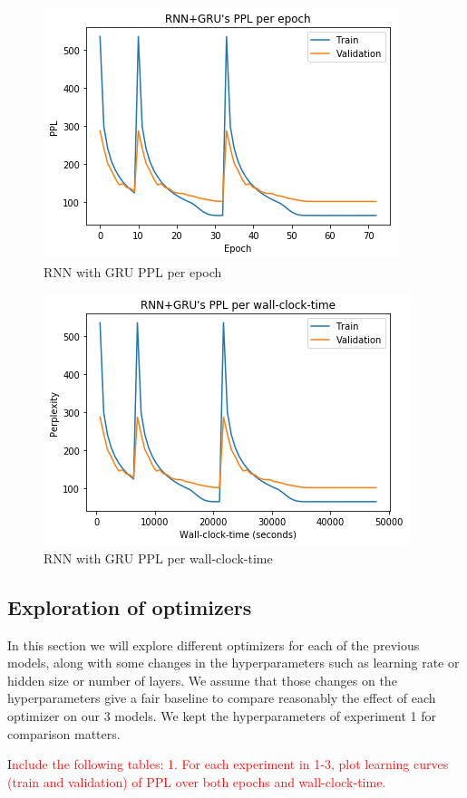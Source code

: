 \begin{figure}[H]
	\centering
	\includegraphics[scale=0.8]{GRU_LC_EPOCH.png}
	\caption{RNN with GRU PPL per epoch}
	\label{fig:fig3}
\end{figure}

\begin{figure}[H]
	\centering
	\includegraphics[scale=0.8]{GRU_LC_TIME.png}
	\caption{RNN with GRU PPL per wall-clock-time}
	\label{fig:fig4}
\end{figure}


\subsection{Exploration of optimizers}
In this section we will explore different optimizers for each of the previous models, along with some changes in the hyperparameters such as learning rate or hidden size or number of layers. We assume that those changes on the hyperparameters give a fair baseline to compare reasonably the effect of each optimizer on our 3 models. We kept the hyperparameters of experiment 1 for comparison matters.

I\textcolor{red}{nclude the following tables:
	1. For each experiment in 1-3, plot learning curves (train and validation) of PPL over both
	epochs and wall-clock-time.}

